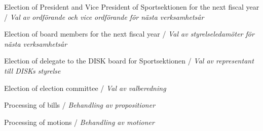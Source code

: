 \item Election of President and Vice President of Sportsektionen for the next fiscal year / \emph{Val av ordförande och vice ordförande för nästa verksamhetsår}
\item Election of board members for the next fiscal year / \emph{Val av styrelseledamöter för nästa verksamhetsår}
\item Election of delegate to the DISK board for Sportsektionen / \emph{Val av representant till DISKs styrelse}
\item Election of election committee / \emph{Val av valberedning}
\item Processing of bills / \emph{Behandling av propositioner}
\item Processing of motions / \emph{Behandling av motioner}
